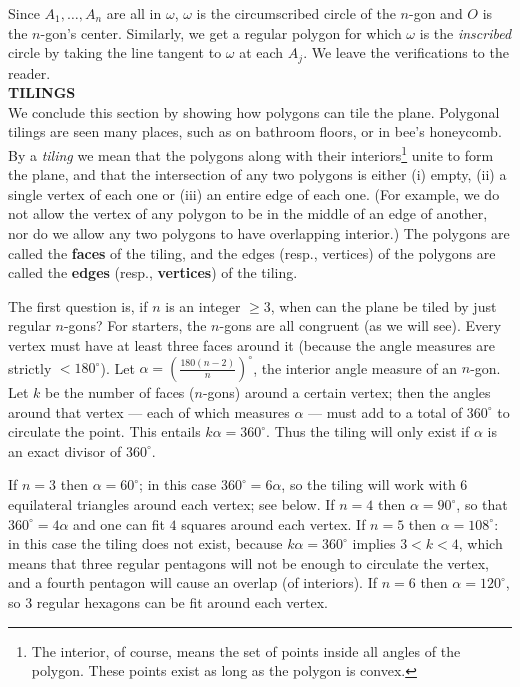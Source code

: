 \documentclass[leqno]{book}
\begin{document}
Since $A_1,\dots,A_n$ are all in $\omega$, $\omega$ is the circumscribed circle of the $n$-gon and $O$ is the $n$-gon's center.  Similarly, we get a regular polygon for which $\omega$ is the \emph{inscribed} circle by taking the line tangent to $\omega$ at each $A_j$.  We leave the verifications to the reader.\\

\noindent\textbf{TILINGS}\\

\noindent We conclude this section by showing how polygons can tile the plane.  Polygonal tilings are seen many places, such as on bathroom floors, or in bee's honeycomb.  By a \emph{tiling} we mean that the polygons along with their interiors\footnote{The interior, of course, means the set of points inside all angles of the polygon.  These points exist as long as the polygon is convex.} unite to form the plane, and that the intersection of any two polygons is either (i) empty, (ii) a single vertex of each one or (iii) an entire edge of each one.  (For example, we do not allow the vertex of any polygon to be in the middle of an edge of another, nor do we allow any two polygons to have overlapping interior.)  The polygons are called the \textbf{faces} of the tiling, and the edges (resp., vertices) of the polygons are called the \textbf{edges} (resp., \textbf{vertices}) of the tiling.

The first question is, if $n$ is an integer $\geqslant 3$, when can the plane be tiled by just regular $n$-gons?  For starters, the $n$-gons are all congruent (as we will see).  Every vertex must have at least three faces around it (because the angle measures are strictly $<180^\circ$).  Let $\alpha=\left(\frac{180(n-2)}n\right)^\circ$, the interior angle measure of an $n$-gon.  Let $k$ be the number of faces ($n$-gons) around a certain vertex; then the angles around that vertex \---- each of which measures $\alpha$ \---- must add to a total of $360^\circ$ to circulate the point.  This entails $k\alpha=360^\circ$.  Thus the tiling will only exist if $\alpha$ is an exact divisor of $360^\circ$.

If $n=3$ then $\alpha=60^\circ$; in this case $360^\circ=6\alpha$, so the tiling will work with $6$ equilateral triangles around each vertex; see below.  If $n=4$ then $\alpha=90^\circ$, so that $360^\circ=4\alpha$ and one can fit $4$ squares around each vertex.  If $n=5$ then $\alpha=108^\circ$: in this case the tiling does not exist, because $k\alpha=360^\circ$ implies $3<k<4$, which means that three regular pentagons will not be enough to circulate the vertex, and a fourth pentagon will cause an overlap (of interiors).  If $n=6$ then $\alpha=120^\circ$, so $3$ regular hexagons can be fit around each vertex.
\end{document}
